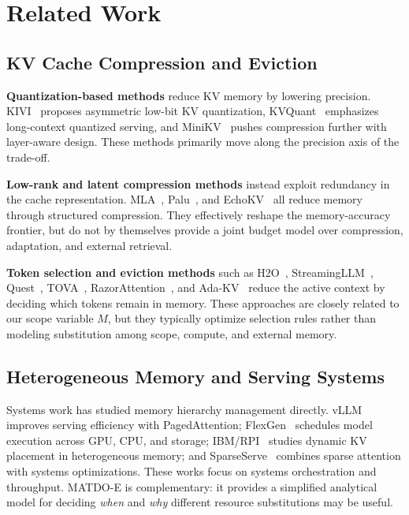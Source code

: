 \documentclass[11pt,a4paper]{article}
\theoremstyle{plain}
\theoremstyle{definition}
\begin{document}
\section{Related Work}
\label{sec:related}

\subsection{KV Cache Compression and Eviction}
\textbf{Quantization-based methods} reduce KV memory by lowering precision. KIVI~\cite{liu2024kivi} proposes asymmetric low-bit KV quantization, KVQuant~\cite{hooper2024kvquant} emphasizes long-context quantized serving, and MiniKV~\cite{sharma2025minikv} pushes compression further with layer-aware design. These methods primarily move along the precision axis of the trade-off.

\textbf{Low-rank and latent compression methods} instead exploit redundancy in the cache representation. MLA~\cite{deepseek2024mla}, Palu~\cite{chang2025palu}, and EchoKV~\cite{ji2026echokv} all reduce memory through structured compression. They effectively reshape the memory-accuracy frontier, but do not by themselves provide a joint budget model over compression, adaptation, and external retrieval.

\textbf{Token selection and eviction methods} such as H2O~\cite{zhang2023h2o}, StreamingLLM~\cite{xiao2024streamingllm}, Quest~\cite{tang2024quest}, TOVA~\cite{he2025tova}, RazorAttention~\cite{tang2025razor}, and Ada-KV~\cite{yuan2024adakv} reduce the active context by deciding which tokens remain in memory. These approaches are closely related to our scope variable $M$, but they typically optimize selection rules rather than modeling substitution among scope, compute, and external memory.

\subsection{Heterogeneous Memory and Serving Systems}
Systems work has studied memory hierarchy management directly. vLLM~\cite{kwon2023} improves serving efficiency with PagedAttention; FlexGen~\cite{sheng2023} schedules model execution across GPU, CPU, and storage; IBM/RPI~\cite{fang2025} studies dynamic KV placement in heterogeneous memory; and SparseServe~\cite{zhou2025} combines sparse attention with systems optimizations. These works focus on systems orchestration and throughput. MATDO-E is complementary: it provides a simplified analytical model for deciding \emph{when} and \emph{why} different resource substitutions may be useful.
\end{document}
